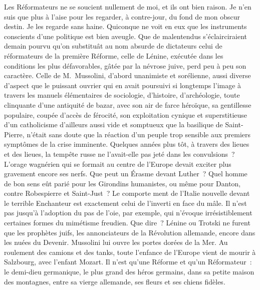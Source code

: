 \documentclass[french,twoside]{book} %
\begin{document}
Les Réformateurs ne se soucient nullement de moi, et ils ont bien raison. Je n’en suis que plus à l’aise pour les regarder, à contre-jour, du fond de mon obscur destin. Je les regarde sans haine. Quiconque ne voit en eux que les instruments conscients d’une politique est bien aveugle. Que de malentendus s’éclairciraient demain pourvu qu’on substituât au nom absurde de dictateurs celui de réformateurs de la première Réforme, celle de Lénine, exécutée dans les conditions les plus défavorables, gâtée par la névrose juive, perd peu à peu son caractère. Celle de M. Mussolini, d’abord unanimiste et sorélienne, aussi diverse d’aspect que le puissant ouvrier qui en avait poursuivi si longtemps l’image à travers les manuels élémentaires de sociologie, d’histoire, d’archéologie, toute clinquante d’une antiquité de bazar, avec son air de farce héroïque, sa gentillesse populaire, coupée d’accès de férocité, son exploitation cynique et superstitieuse d’un catholicisme d’ailleurs aussi vide et somptueux que la basilique de Saint-Pierre, n’était sans doute que la réaction d’un peuple trop sensible aux premiers symptômes de la crise imminente. Quelques années plus tôt, à travers des lieues et des lieues, la tempête russe ne l’avait-elle pas jeté dans les convulsions ? L’orage wagnérien qui se formait au centre de l’Europe devait exciter plus gravement encore ses nerfs. Que peut un Érasme devant Luther ? Quel homme de bon sens eût parié pour les Girondins humanistes, ou même pour Danton, contre Robespierre et Saint-Just ? Le comporte ment de l’Italie nouvelle devant le terrible Enchanteur est exactement celui de l’inverti en face du mâle. Il n’est pas jusqu’à l’adoption du pas de l’oie, par exemple, qui n’évoque irrésistiblement certaines formes du mimétisme freudien. Que dire ? Lénine ou Trotski ne furent que les prophètes juifs, les annonciateurs de la Révolution allemande, encore dans les nuées du Devenir. Mussolini lui ouvre les portes dorées de la Mer. Au roulement des camions et des tanks, toute l’enfance de l’Europe vient de mourir à Salzbourg, avec l’enfant Mozart. Il n’est qu’une Réforme et qu’un Réformateur : le demi-dieu germanique, le plus grand des héros germains, dans sa petite maison des montagnes, entre sa vierge allemande, ses fleurs et ses chiens fidèles.\par
\end{document}

